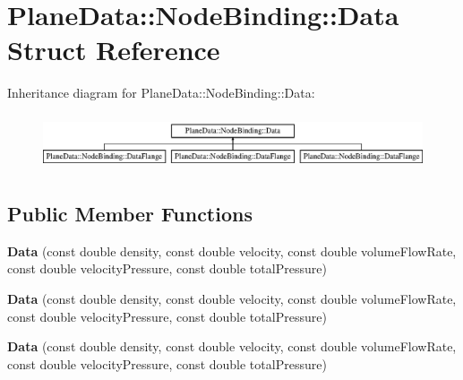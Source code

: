 \hypertarget{struct_plane_data_1_1_node_binding_1_1_data}{}\section{Plane\+Data\+:\+:Node\+Binding\+:\+:Data Struct Reference}
\label{struct_plane_data_1_1_node_binding_1_1_data}
Inheritance diagram for Plane\+Data\+:\+:Node\+Binding\+:\+:Data\+:\begin{figure}[H]
\begin{center}
\leavevmode
\includegraphics[height=1.644640cm]{d8/dbd/struct_plane_data_1_1_node_binding_1_1_data}
\end{center}
\end{figure}
\subsection*{Public Member Functions}
\begin{DoxyCompactItemize}
\item 
\mbox{\label{struct_plane_data_1_1_node_binding_1_1_data_a2a5a91360718fa29928d9604628bf6da}} 
{\bfseries Data} (const double density, const double velocity, const double volume\+Flow\+Rate, const double velocity\+Pressure, const double total\+Pressure)
\item 
\mbox{\label{struct_plane_data_1_1_node_binding_1_1_data_a2a5a91360718fa29928d9604628bf6da}} 
{\bfseries Data} (const double density, const double velocity, const double volume\+Flow\+Rate, const double velocity\+Pressure, const double total\+Pressure)
\item 
\mbox{\label{struct_plane_data_1_1_node_binding_1_1_data_a2a5a91360718fa29928d9604628bf6da}} 
{\bfseries Data} (const double density, const double velocity, const double volume\+Flow\+Rate, const double velocity\+Pressure, const double total\+Pressure)
\end{DoxyCompactItemize}
